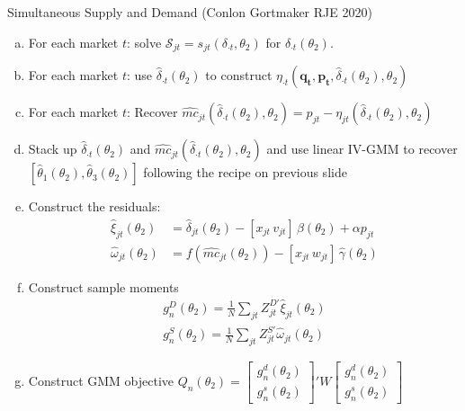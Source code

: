 \begin{frame}{Simultaneous Supply and Demand (Conlon Gortmaker RJE 2020)}
\tiny
\begin{enumerate}[(a)]
\item For each market $t$: solve $\mathcal{S}_{jt} = s_{jt}(\delta_{\cdot t},\theta_2)$ for $\widehat{\delta}_{\cdot t}(\theta_2)$.
\item For each market $t$: use $\widehat{\delta}_{\cdot t}(\theta_2)$ to construct $\eta_{\cdot 
t}(\mathbf{q_t},\mathbf{p_t},\widehat{\delta}_{\cdot t}(\theta_2),\theta_2)$
\item For each market $t$: Recover $\widehat{mc}_{jt}(\widehat{\delta}_{\cdot t}(\theta_2),\theta_2) = p_{jt} - \eta_{jt}(\widehat{\delta}_{\cdot t}(\theta_2),\theta_2)$
\item Stack up $\widehat{\delta}_{\cdot t}(\theta_2)$ and $\widehat{mc}_{jt}(\widehat{\delta}_{\cdot t}(\theta_2),\theta_2)$ and use linear IV-GMM to recover $[\widehat{\theta}_1(\theta_2), \widehat{\theta}_3(\theta_2) ]$ following the recipe on previous slide
\item Construct the residuals:
\begin{align*}
\nonumber    \widehat{\xi}_{jt}(\theta_2) &= \widehat{\delta}_{jt}(\theta_2) -   [x_{jt}\, v_{jt}]\, \widehat{\beta}(\theta_2) + \alpha p_{jt}\\
    \widehat{\omega}_{jt}(\theta_2) &= f(\widehat{mc}_{jt}(\theta_2)) -  [x_{jt}\, w_{jt}]\, \widehat{\gamma}(\theta_2)
\end{align*}
\item Construct sample moments
\begin{align*}
\nonumber g_n^D(\theta_2)=\frac{1}{N} \sum_{jt} Z_{jt}^{D\prime} \widehat{\xi}_{jt}(\theta_2)\\
 g_n^S(\theta_2)=\frac{1}{N} \sum_{jt} Z_{jt}^{S \prime} \widehat{\omega}_{jt}(\theta_2)
\end{align*}
\item Construct GMM objective $Q_n(\theta_2)= \left[ {\begin{array}{c} g_n^d(\theta_2) \\ g_n^s(\theta_2) \end{array} } \right]' W  \left[ {\begin{array}{c} g_n^d(\theta_2) \\ g_n^s(\theta_2) \end{array} } \right] $
\end{enumerate}
\end{frame}

